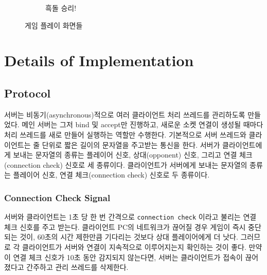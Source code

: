 \documentclass[a4paper, 10pt]{article}
\begin{document}
\begin{figure}[h]
\begin{subfigure}{.3\textwidth}
    \caption{흑돌 승리!}
    \label{fig:room}
  \end{subfigure}
  \caption{게임 플레이 화면들}
\end{figure}

\section{Details of Implementation}
\subsection{Protocol}
서버는 비동기(asynchronous)적으로 여러 클라이언트 처리 쓰레드를 관리하도록
만들었다. 메인 서버는 그저 bind 및 accept만 진행하고, 새로운 소켓 연결이
생성될 때마다 처리 쓰레드를 새로 만들어 실행하는 역할만 수행한다.
기본적으로 서버 쓰레드와 클라이언트는 줄 단위로 짧은 길이의 문자열을 주고받는
통신을 한다. 서버가 클라이언트에게 보내는 문자열의 종류는 플레이어 신호,
상대(opponent) 신호, 그리고 연결 체크(connection check) 신호로 세 종류이다.
클라이언트가 서버에게 보내는 문자열의 종류는 플레이어 신호, 연결 체크(connection
check) 신호로 두 종류이다.

\subsubsection{Connection Check Signal}
서버와 클라이언트는 1초 당 한 번 간격으로 \texttt{connection check}
이라고 불리는 연결 체크 신호를 주고 받는다. 클라이언트 PC의 네트워크가
끊어질 경우 게임이 즉시 중단되는 것이, 60초의 시간 제한만큼 기다리는 것보다
상대 플레이어에게 더 낫다. 그러므로 각 클라이언트가 서버와 연결이 지속적으로
이루어지는지 확인하는 것이 좋다. 만약 이 연결 체크 신호가 10초 동안 감지되지
않는다면, 서버는 클라이언트가 접속이 끊어졌다고 간주하고 관리 쓰레드를 삭제한다.
\end{document}
